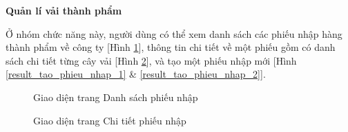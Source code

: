 \textbf{Quản lí vải thành phẩm}

Ở nhóm chức năng này, người dùng có thể xem danh sách các phiếu nhập hàng thành phẩm về công ty [Hình \ref{result_danh_sach_phieu_nhap}], thông tin chi tiết về một phiếu gồm có danh sách chi tiết từng cây vải [Hình \ref{result_chi_tiet_phieu_nhap}], và tạo một phiếu nhập mới [Hình \ref{result_tao_phieu_nhap_1} \& \ref{result_tao_phieu_nhap_2}].

\begin{figure}[H]
    \begin{center}
        \caption{Giao diện trang Danh sách phiếu nhập}
        \label{result_danh_sach_phieu_nhap}
    \end{center}
\end{figure}

\begin{figure}[H]
    \begin{center}
        \caption{Giao diện trang Chi tiết phiếu nhập}
        \label{result_chi_tiet_phieu_nhap}
    \end{center}
\end{figure}

